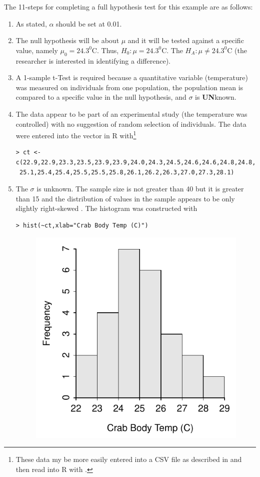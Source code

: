 \documentclass[10pt,openany]{book}\usepackage[]{graphicx}\usepackage[]{color}
\makeatletter
\newenvironment{kframe}{%
 \def\at@end@of@kframe{}%
 \ifinner\ifhmode%
  \def\at@end@of@kframe{\end{minipage}}%
  \begin{minipage}{\columnwidth}%
 \fi\fi%
 \def\FrameCommand##1{\hskip\@totalleftmargin \hskip-\fboxsep
 \colorbox{shadecolor}{##1}\hskip-\fboxsep
     \hskip-\linewidth \hskip-\@totalleftmargin \hskip\columnwidth}%
 \MakeFramed {\advance\hsize-\width
   \@totalleftmargin\z@ \linewidth\hsize
   \@setminipage}}%
 {\par\unskip\endMakeFramed%
 \at@end@of@kframe}
\newenvironment{knitrout}{}{} %
\makeatother
\begin{document}
The 11-steps  for completing a full hypothesis test for this example are as follows:
\begin{enumerate}
    \item As stated, $\alpha$ should be set at 0.01.
    \item The null hypothesis will be about $\mu$ and it will be tested against a specific value, namely $\mu_{0}=24.3^{0}$C.  Thus, $H_{0}:\mu=24.3^{0}$C.  The $H_{A}:\mu\neq24.3^{0}$C (the researcher is interested in identifying a difference).
    \item A 1-sample t-Test is required because a quantitative variable (temperature) was measured on individuals from one population, the population mean is compared to a specific value in the null hypothesis, and $\sigma$ is \textbf{UN}known.
    \item The data appear to be part of an experimental study (the temperature was controlled) with no suggestion of random selection of individuals.  The data were entered into the  vector in R with\footnote{These data my be more easily entered into a CSV file as described in  and then read into R with .}
\begin{knitrout}
\color{fgcolor}\begin{kframe}
\begin{verbatim}
> ct <- c(22.9,22.9,23.3,23.5,23.9,23.9,24.0,24.3,24.5,24.6,24.6,24.8,24.8,
 25.1,25.4,25.4,25.5,25.5,25.8,26.1,26.2,26.3,27.0,27.3,28.1)
\end{verbatim}
\end{kframe}
\end{knitrout}
    \item The $\sigma$ is unknown.  The sample size is not greater than 40 but it is greater than 15 and the distribution of values in the sample appears to be only slightly right-skewed .  The histogram was constructed with
\begin{knitrout}
\color{fgcolor}\begin{kframe}
\begin{verbatim}
> hist(~ct,xlab="Crab Body Temp (C)")
\end{verbatim}
\end{kframe}\begin{figure}[hbtp]

{\centering \includegraphics[width=.3\linewidth]{Figs/CrabTempHist-1} 

}
\end{figure}
\end{knitrout}
\end{enumerate}
\end{document}
